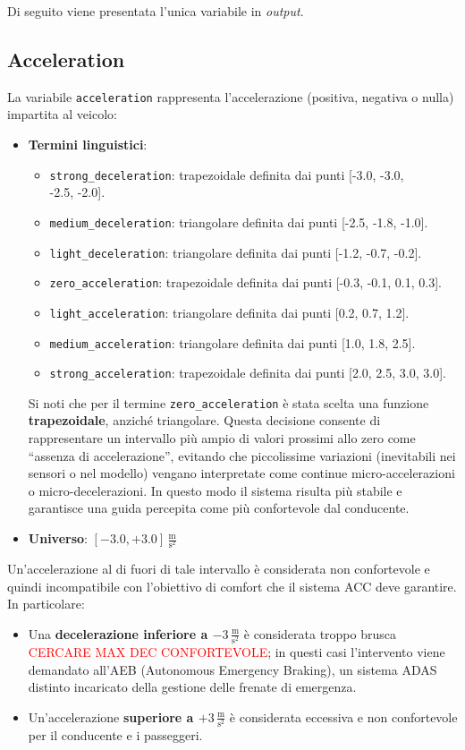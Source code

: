 \vspace{10mm}
\noindent Di seguito viene presentata l'unica variabile in \emph{output}.

\subsection{Acceleration}
La variabile \texttt{acceleration} rappresenta l'accelerazione (positiva, negativa o nulla) impartita al veicolo:
\begin{itemize}
  \item \textbf{Termini linguistici}:
    \begin{itemize}
      \item \texttt{strong\_deceleration}: trapezoidale definita dai punti [-3.0, -3.0, \\ -2.5, -2.0].
      \item \texttt{medium\_deceleration}: triangolare definita dai punti [-2.5, -1.8, -1.0].
      \item \texttt{light\_deceleration}: triangolare definita dai punti [-1.2, -0.7, -0.2].
      \item \texttt{zero\_acceleration}: trapezoidale definita dai punti [-0.3, -0.1, 0.1, 0.3].
      \item \texttt{light\_acceleration}: triangolare definita dai punti [0.2, 0.7, 1.2].
      \item \texttt{medium\_acceleration}: triangolare definita dai punti [1.0, 1.8, 2.5].
      \item \texttt{strong\_acceleration}: trapezoidale definita dai punti [2.0, 2.5, 3.0, 3.0].
    \end{itemize}
    \noindent Si noti che per il termine \texttt{zero\_acceleration} è stata scelta una funzione \textbf{trapezoidale}, anziché triangolare.  
  Questa decisione consente di rappresentare un intervallo più ampio di valori prossimi allo zero come “assenza di accelerazione”, evitando che piccolissime variazioni (inevitabili nei sensori o nel modello) vengano interpretate come continue micro-accelerazioni o micro-decelerazioni.  
  In questo modo il sistema risulta più stabile e garantisce una guida percepita come più confortevole dal conducente.
  \item \textbf{Universo}: \([-3.0,+3.0]\)\,$\frac{\mathrm{m}}{\mathrm{s^2}}$
\end{itemize}
Un'accelerazione al di fuori di tale intervallo è considerata non confortevole e quindi incompatibile con l'obiettivo di comfort che il sistema ACC deve garantire.  
In particolare:
\begin{itemize}
  \item Una \textbf{decelerazione inferiore a \(-3\,\tfrac{\mathrm{m}}{\mathrm{s^2}}\)} è considerata troppo brusca 
  \textcolor{red}{CERCARE MAX DEC CONFORTEVOLE}; 
  in questi casi l'intervento viene demandato all'AEB (Autonomous Emergency Braking), un sistema ADAS distinto 
  incaricato della gestione delle frenate di emergenza.
  \item Un'accelerazione \textbf{superiore a \(+3\,\tfrac{\mathrm{m}}{\mathrm{s^2}}\)} è considerata eccessiva e non 
  confortevole per il conducente e i passeggeri.
\end{itemize}

